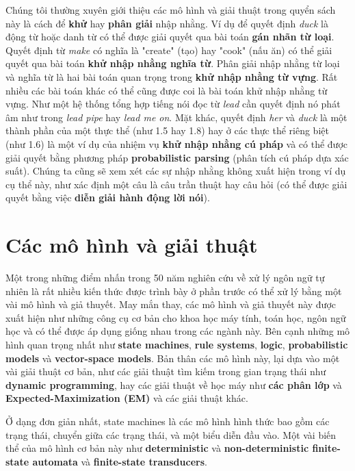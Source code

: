 Chúng tôi thường xuyên giới thiệu các mô hình và giải thuật trong quyển sách này là cách để \textbf{khử} hay \textbf{phân giải} nhập nhằng. Ví dụ để quyết định \textit{duck} là động từ hoặc danh từ có thể được giải quyết qua bài toán \textbf{gán nhãn từ loại}. Quyết định từ \textit{make} có nghĩa là "create" (tạo) hay "cook" (nấu ăn) có thể giải quyết qua bài toán \textbf{khử nhập nhằng nghĩa từ}. Phân giải nhập nhằng từ loại và nghĩa từ là hai bài toán quan trọng trong \textbf{khử nhập nhằng từ vựng}. Rất nhiều các bài toán khác có thể cũng được coi là bài toán khử nhập nhằng từ vựng. Như một hệ thống tổng hợp tiếng nói đọc từ \textit{lead} cần quyết định nó phát âm như trong \textit{lead pipe} hay \textit{lead me on}. Mặt khác, quyết định \textit{her} và \textit{duck} là một thành phần của một thực thể (như 1.5 hay 1.8) hay ở các thực thể riêng biệt (như 1.6) là một ví dụ của nhiệm vụ \textbf{khử nhập nhằng cú pháp} và có thể được giải quyết bằng phương pháp \textbf{probabilistic parsing} (phân tích cú pháp dựa xác suất). Chúng ta cũng sẽ xem xét các sự nhập nhằng không xuất hiện trong ví dụ cụ thể này, như xác định một câu là câu trần thuật hay câu hỏi (có thể được giải quyết bằng việc \textbf{diễn giải hành động lời nói}).

\section{Các mô hình và giải thuật}

Một trong những điểm nhấn trong 50 năm nghiên cứu về xử lý ngôn ngữ tự nhiên là rất nhiều kiến thức được trình bày ở phần trước có thể xử lý bằng một vài mô hình và giả thuyết. May mắn thay, các mô hình và giả thuyết này được xuất hiện như những công cụ cơ bản cho khoa học máy tính, toán học, ngôn ngữ học và có thể được áp dụng giống nhau trong các ngành này. Bên cạnh những mô hình quan trọng nhất như \textbf{state machines}, \textbf{rule systems}, \textbf{logic}, \textbf{probabilistic models} và \textbf{vector-space models}. Bản thân các mô hình này, lại dựa vào một vài giải thuật cơ bản, như các giải thuật tìm kiếm trong gian trạng thái như \textbf{dynamic programming}, hay các giải thuật về học máy như \textbf{các phân lớp} và \textbf{Expected-Maximization (EM)} và các giải thuật khác.

Ở dạng đơn giản nhất, state machines là các mô hình hình thức bao gồm các trạng thái, chuyển giữa các trạng thái, và một biểu diễn đầu vào. Một vài biến thể của mô hình cơ bản này như \textbf{deterministic} và \textbf{non-deterministic finite-state automata} và \textbf{finite-state transducers}.

